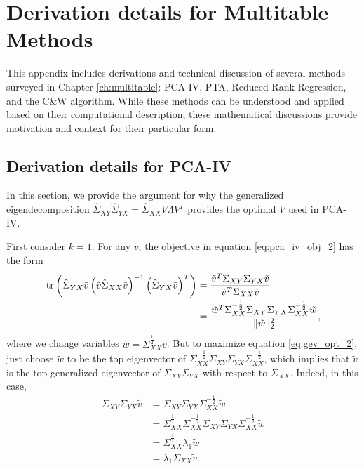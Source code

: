 \chapter{Derivation details for Multitable Methods}
\label{ch:multitable_supp_derivations}

This appendix includes derivations and technical discussion of several methods
surveyed in Chapter \ref{ch:multitable}: PCA-IV, PTA, Reduced-Rank Regression,
and the C\&W algorithm. While these methods can be understood and applied based
on their computational description, these mathematical discussions provide
motivation and context for their particular form.

\section{Derivation details for PCA-IV}
\label{subsec:pca_iv_derivation}

In this section, we provide the argument for why the generalized
eigendecomposition $\hat{\Sigma}_{XY}\hat{\Sigma}_{YX} =
\hat{\Sigma}_{XX}V\Lambda V^{T}$ provides the optimal $V$ used in PCA-IV.

First consider $k = 1$. For any $\tilde{v}$, the objective
in equation \ref{eq:pca_iv_obj_2} has the form
\begin{align}
  \mathop\mathrm{tr}\left(\hat{\Sigma}_{YX}\tilde{v}\left(\tilde{v}\hat{\Sigma}_{XX}\tilde{v}\right)^{-1}
  \left(\hat{\Sigma}_{YX}\tilde{v}\right)^{T}\right) &=
  \frac{\tilde{v}^{T}\Sigma_{XY}\Sigma_{YX}\tilde{v}}{\tilde{v}^{T}\Sigma_{XX}\tilde{v}} \nonumber \\
  &= \frac{\tilde{w}^{T}\Sigma_{XX}^{-\frac{1}{2}}\Sigma_{XY}\Sigma_{YX}\Sigma_{XX}^{-\frac{1}{2}}\tilde{w}}{\|\tilde{w}\|_{2}^{2}}, \label{eq:gev_opt_2}
\end{align}
where we change variables $\tilde{w} = \Sigma_{XX}^{\frac{1}{2}}\tilde{v}$. But
to maximize equation \ref{eq:gev_opt_2}, just choose $\tilde{w}$ to be the top
eigenvector of
$\Sigma_{XX}^{-\frac{1}{2}}\Sigma_{XY}\Sigma_{YX}\Sigma_{XX}^{-\frac{1}{2}}$,
which implies that $\tilde{v}$ is the top generalized eigenvector of
$\Sigma_{XY}\Sigma_{YX}$ with respect to $\Sigma_{XX}$. Indeed, in this case,
\begin{align*}
  \Sigma_{XY}\Sigma_{YX}\tilde{v}
  &=\Sigma_{XY}\Sigma_{YX}\Sigma_{XX}^{-\frac{1}{2}}\tilde{w} \\
  &= \Sigma_{XX}^{\frac{1}{2}} \Sigma_{XX}^{-\frac{1}{2}}\Sigma_{XY}\Sigma_{YX} \Sigma_{XX}^{-\frac{1}{2}}\tilde{w}\\
  &= \Sigma_{XX}^{\frac{1}{2}}\lambda_{1}\tilde{w} \\
  &= \lambda_{1}\Sigma_{XX}\tilde{v}.
\end{align*}

